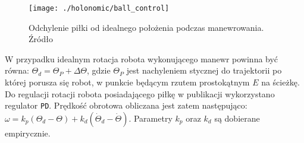 \begin{figure}[h]
\centering
\texttt{[image: ./holonomic/ball\_control]}
\caption{ Odchylenie piłki od idealnego położenia podczas manewrowania. Źródło \cite{dribbling} }\label{fig:ball_control}
\end{figure}
W przypadku idealnym rotacja robota wykonującego manewr powinna być równa: $\Theta_{d}=\Theta_{P} + \Delta\Theta$, gdzie $\Theta_{P}$ jest nachyleniem stycznej do trajektorii po której porusza się robot, w punkcie
będącym rzutem prostokątnym $E$ na ścieżkę.  Do regulacji rotacji robota posiadającego piłkę w publikacji \cite{dribbling}
wykorzystano regulator \texttt{PD}. Prędkość obrotowa obliczana jest zatem następująco: $\omega=k_p(\Theta_d -\Theta) +k_d(\dot{\Theta}_d -\dot{\Theta} )$. Parametry $k_p$ oraz $k_d$ są dobierane empirycznie.


